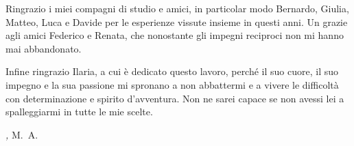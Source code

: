 Ringrazio i miei compagni di studio e amici, in particolar modo Bernardo, Giulia, Matteo, Luca e Davide per le esperienze vissute insieme in questi anni. Un grazie agli amici Federico e Renata, che nonostante gli impegni reciproci non mi hanno mai abbandonato. 

Infine ringrazio Ilaria, a cui è dedicato questo lavoro, perché il suo cuore, il suo impegno e la sua passione mi spronano a non abbattermi e a vivere le difficoltà con determinazione e spirito d'avventura. Non ne sarei capace se non avessi lei a spalleggiarmi in tutte le mie scelte.\\ 



\bigskip
 
\noindent\textit{\myLocation, \MakeTextLowercase{\myTime}}
\hfill M.~A.

\endgroup

